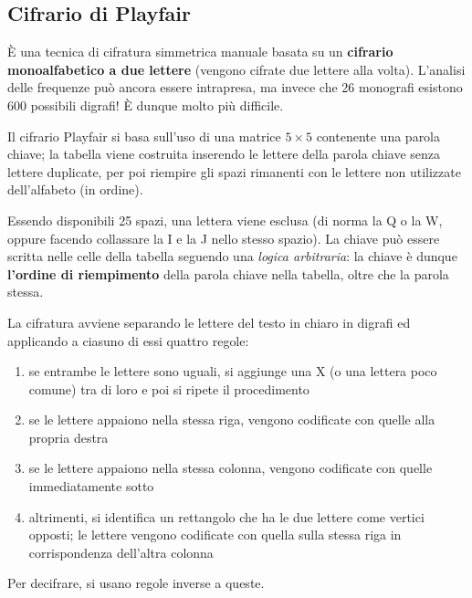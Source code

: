 \subsection{Cifrario di Playfair}

È una tecnica di cifratura simmetrica manuale basata su un \textbf{cifrario monoalfabetico a due lettere} (vengono cifrate due 
lettere alla volta). L'analisi delle frequenze può ancora essere intrapresa, ma invece che 26 monografi esistono 
600 possibili digrafi! È dunque molto più difficile.

\noindent Il cifrario Playfair si basa sull'uso di una matrice $5 \times 5$ contenente una parola chiave; la tabella viene 
costruita inserendo le lettere della parola chiave senza lettere duplicate, per poi riempire gli spazi rimanenti con le lettere non utilizzate 
dell'alfabeto (in ordine).

\noindent Essendo disponibili 25 spazi, una lettera viene esclusa (di norma la Q o la W, oppure facendo collassare la I e la J nello 
stesso spazio). La chiave può essere scritta nelle celle della tabella seguendo una \textit{logica arbitraria}: la chiave è dunque 
\textbf{l'ordine di riempimento} della parola chiave nella tabella, oltre che la parola stessa.

\noindent La cifratura avviene separando le lettere del testo in chiaro in digrafi ed applicando a ciasuno di essi quattro regole:
\begin{enumerate}
    \item se entrambe le lettere sono uguali, si aggiunge una X (o una lettera poco comune) tra di loro e poi si ripete il procedimento 
    \item se le lettere appaiono nella stessa riga, vengono codificate con quelle alla propria destra 
    \item se le lettere appaiono nella stessa colonna, vengono codificate con quelle immediatamente sotto 
    \item altrimenti, si identifica un rettangolo che ha le due lettere come vertici opposti; le lettere vengono codificate con quella 
    sulla stessa riga in corrispondenza dell'altra colonna 
\end{enumerate}

\noindent Per decifrare, si usano regole inverse a queste.

